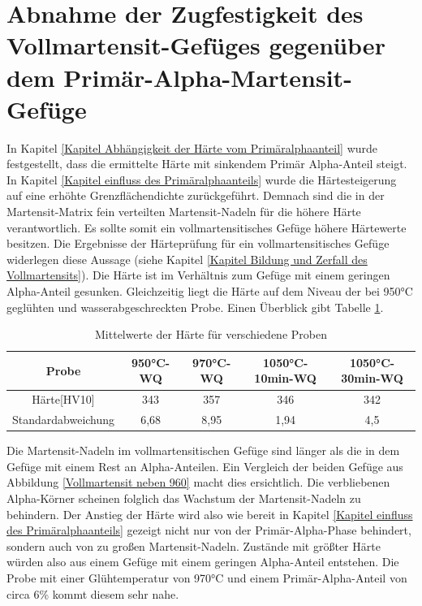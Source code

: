 \documentclass[a4paper, 11pt]{tubsreprt}
\begin{document}
\section*{Abnahme der Zugfestigkeit des Vollmartensit-Gefüges gegenüber dem Primär-Alpha-Martensit-Gefüge}
In Kapitel \ref{Kapitel Abhängigkeit der Härte vom Primäralphaanteil} wurde festgestellt, dass die ermittelte Härte mit sinkendem Primär Alpha-Anteil steigt. In Kapitel \ref{Kapitel einfluss des Primäralphaanteils} wurde die Härtesteigerung auf eine erhöhte Grenzflächendichte zurückgeführt. Demnach sind die in der Martensit-Matrix fein verteilten Martensit-Nadeln für die höhere Härte verantwortlich.
Es sollte somit ein vollmartensitisches Gefüge höhere Härtewerte besitzen.
Die Ergebnisse der Härteprüfung für ein vollmartensitisches Gefüge  widerlegen diese Aussage (siehe Kapitel \ref{Kapitel Bildung und Zerfall des Vollmartensits}). Die Härte ist im Verhältnis zum Gefüge mit einem geringen Alpha-Anteil gesunken. Gleichzeitig liegt die Härte auf dem Niveau der bei 950°C geglühten und wasserabgeschreckten Probe. Einen Überblick gibt Tabelle \ref{Tabelle Mittelwerte Härte für verschiedene Proben}.
\begin{table}
\begin{tabular}{c|c|c|c|c}
Probe & 950°C-WQ & 970°C-WQ & 1050°C-10min-WQ & 1050°C-30min-WQ \\
\hline
Härte[HV10] & 343 & 357 & 346 & 342 \\
\hline
Standardabweichung & 6,68 & 8,95 & 1,94 & 4,5 \\

\end{tabular}
\caption{Mittelwerte der Härte für verschiedene Proben}
\label{Tabelle Mittelwerte Härte für verschiedene Proben}
\end{table}

Die Martensit-Nadeln im vollmartensitischen Gefüge sind länger als die in dem Gefüge mit einem Rest an Alpha-Anteilen. Ein Vergleich der beiden Gefüge aus Abbildung \ref{Vollmartensit neben 960} macht dies ersichtlich. Die verbliebenen Alpha-Körner scheinen folglich das Wachstum der Martensit-Nadeln zu behindern. Der Anstieg der Härte wird also wie bereit in Kapitel \ref{Kapitel einfluss des Primäralphaanteils} gezeigt nicht nur von der Primär-Alpha-Phase behindert, sondern auch von zu großen Martensit-Nadeln. Zustände mit größter Härte würden also aus einem Gefüge mit einem geringen Alpha-Anteil entstehen. Die Probe mit einer Glühtemperatur von 970°C und einem Primär-Alpha-Anteil von circa 6\% kommt diesem sehr nahe.
\end{document}
